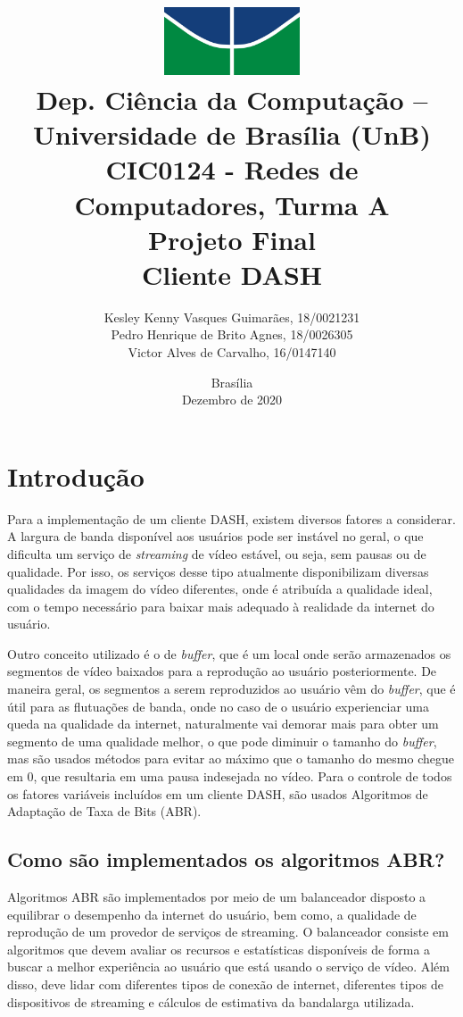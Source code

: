 \documentclass[12pt]{article}
\title{
        \includegraphics[width=4cm]{img/logo.jpg} \\ 
        \large
        Dep. Ciência da Computação -- Universidade de Brasília (UnB)\\
        CIC0124 - Redes de Computadores, Turma A \\
        \vfill 
        \vfill
        \LARGE
        \textbf{Projeto Final\\
        Cliente DASH}
        \vfill
    }
\author{
        Kesley Kenny Vasques Guimarães, 18/0021231\\
        Pedro Henrique de Brito Agnes, 18/0026305\\
        Victor Alves de Carvalho, 16/0147140
    }
\affil{
        \vfill
        \vfill
        \vfill
        Professor \\
        Dr. Marcos Fagundes Caetano
    }
\date{Brasília\\Dezembro de 2020}
\begin{document}
\maketitle
\newpage


\section{Introdução}
Para a implementação de um cliente DASH, existem diversos fatores a considerar. A largura de banda disponível aos usuários pode ser instável no geral, o que dificulta um serviço de \textit{streaming} de vídeo estável, ou seja, sem pausas ou de qualidade. Por isso, os serviços desse tipo atualmente disponibilizam diversas qualidades da imagem do vídeo diferentes, onde é atribuída a qualidade ideal, com o tempo necessário para baixar mais adequado à realidade da internet do usuário.


Outro conceito utilizado é o de \textit{buffer}, que é um local onde serão armazenados os segmentos de vídeo baixados para a reprodução ao usuário posteriormente. De maneira geral, os segmentos a serem reproduzidos ao usuário vêm do \textit{buffer}, que é útil para as flutuações de banda, onde no caso de o usuário experienciar uma queda na qualidade da internet, naturalmente vai demorar mais para obter um segmento de uma qualidade melhor, o que pode diminuir o tamanho do \textit{buffer}, mas são usados métodos para evitar ao máximo que o tamanho do mesmo chegue em 0, que resultaria em uma pausa indesejada no vídeo. Para o controle de todos os fatores variáveis incluídos em um cliente DASH, são usados Algoritmos de Adaptação de Taxa de Bits (ABR).

\subsection{Como são implementados os algoritmos ABR?}
Algoritmos ABR são implementados por meio de um balanceador disposto a equilibrar o desempenho da internet do usuário, bem como, a qualidade de reprodução de um provedor de serviços de streaming. O balanceador consiste em algoritmos que devem avaliar os recursos e estatísticas disponíveis de forma a buscar a melhor experiência ao usuário que está usando o serviço de vídeo. Além disso, deve lidar com diferentes tipos de conexão de internet, diferentes tipos de dispositivos de streaming e cálculos de estimativa da bandalarga utilizada.
\end{document}

